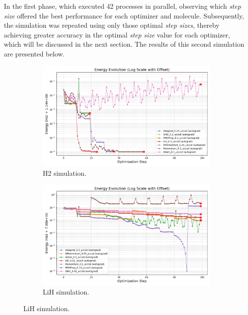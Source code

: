 In the first phase, which executed 42 processes in parallel, observing which \emph{step size} offered the best performance for each optimizer and molecule. Subsequently, the simulation was repeated using only those optimal \emph{step sizes}, thereby achieving greater accuracy in the optimal \emph{step size} value for each optimizer, which will be discussed in the next section. The results of this second simulation are presented below.


\begin{figure}[H]
  \centering
  \begin{subfigure}{0.45\textwidth}
    \includegraphics[width=\textwidth]{data/Optimizadores/final_results_H2/energy_evolution_log_offset.png}
    \caption{H2 simulation.}
    \label{fig:subimage1}
  \end{subfigure}
  \begin{subfigure}{0.45\textwidth}
    \includegraphics[width=\textwidth]{data/Optimizadores/final_results_LiH/energy_evolution_log_offset.png}
    \caption{LiH simulation.}

\end{subfigure}
\end{figure}
